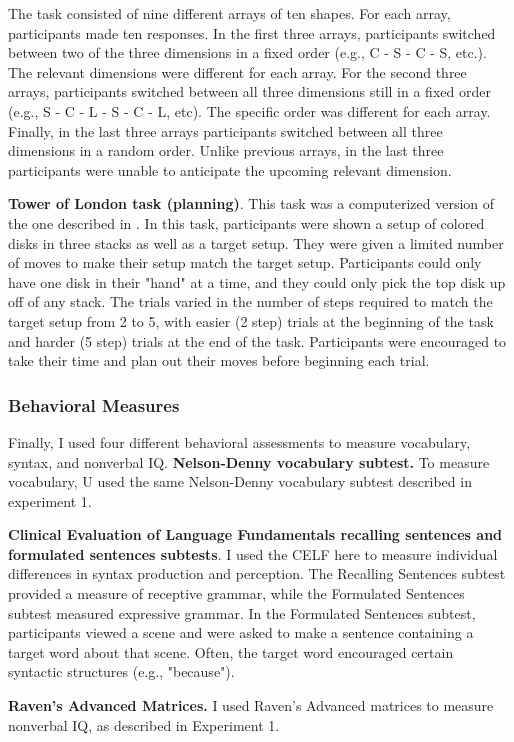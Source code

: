 \documentclass[../dissertation.tex]{subfiles}
\begin{document}
The task consisted of nine different arrays of ten shapes. For each array, participants made ten responses. In the first three arrays, participants switched between two of the three dimensions in a fixed order (e.g., C - S - C - S, etc.). The relevant dimensions were different for each array. For the second three arrays, participants switched between all three dimensions still in a fixed order (e.g., S - C - L - S - C - L, etc). The specific order was different for each array. Finally, in the last three arrays participants switched between all three dimensions in a random order. Unlike previous arrays, in the last three participants were unable to anticipate the upcoming relevant dimension. \par
\textbf{Tower of London task (planning)}. This task was a computerized version of the one described in \citet{Shallice1982}. In this task, participants were shown a setup of colored disks in three stacks as well as a target setup. They were given a limited number of moves to make their setup match the target setup. Participants could only have one disk in their "hand" at a time, and they could only pick the top disk up off of any stack. The trials varied in the number of steps required to match the target setup from 2 to 5, with easier (2 step) trials at the beginning of the task and harder (5 step) trials at the end of the task. Participants were encouraged to take their time and plan out their moves before beginning each trial. 

\subsubsection{Behavioral Measures} 
Finally, I used four different behavioral assessments to measure vocabulary, syntax, and nonverbal IQ.
\textbf{Nelson-Denny vocabulary subtest.} To measure vocabulary, U used the same Nelson-Denny vocabulary subtest described in experiment 1. \par
\textbf{Clinical Evaluation of Language Fundamentals recalling sentences and formulated sentences subtests}. I used the CELF here to measure individual differences in syntax production and perception. The Recalling Sentences subtest provided a measure of receptive grammar, while the Formulated Sentences subtest measured expressive grammar. In the Formulated Sentences subtest, participants viewed a scene and were asked to make a sentence containing a target word about that scene. Often, the target word encouraged certain syntactic structures (e.g., "because"). \par
\textbf{Raven's Advanced Matrices.} I used Raven's Advanced matrices to measure nonverbal IQ, as described in Experiment 1.
\end{document}
